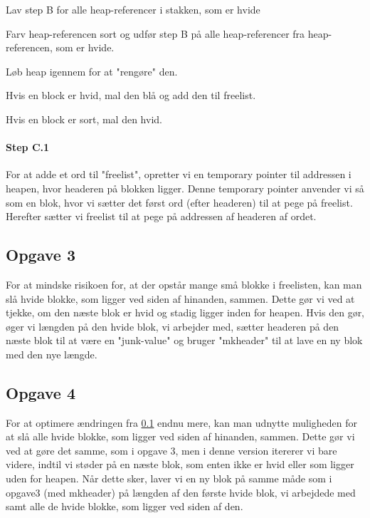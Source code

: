 \begin{my_description}
\item[Step A] Lav step B for alle heap-referencer i stakken, som er hvide
\item[Step B] Farv heap-referencen sort og udfør step B på alle heap-referencer fra heap-referencen, som er hvide.
\item[Step C] Løb heap igennem for at "rengøre" den.
	\begin{my_description}
	\item[Step C.1] Hvis en block er hvid, mal den blå og add den til freelist.
	\item[Step C.2] Hvis en block er sort, mal den hvid.
	\end{my_description}
\end{my_description}

\paragraph{Step C.1}
For at adde et ord til "freelist", opretter vi en temporary pointer til addressen i heapen, hvor headeren på blokken ligger. Denne temporary pointer anvender vi så som en blok, hvor vi sætter det først ord (efter headeren) til at pege på freelist. Herefter sætter vi freelist til at pege på addressen af headeren af ordet.

\subsection{Opgave 3}
\label{O2_3}
For at mindske risikoen for, at der opstår mange små blokke i freelisten, kan man slå hvide blokke, som ligger ved siden af hinanden, sammen. Dette gør vi ved at tjekke, om den næste blok er hvid og stadig ligger inden for heapen. Hvis den gør, øger vi længden på den hvide blok, vi arbejder med, sætter headeren på den næste blok til at være en "junk-value" og bruger "mkheader" til at lave en ny blok med den nye længde.
 
\subsection{Opgave 4}
\label{O2_4}
For at optimere ændringen fra \ref{O2_3} endnu mere, kan man udnytte muligheden for at slå alle hvide blokke, som ligger ved siden af hinanden, sammen. Dette gør vi ved at gøre det samme, som i opgave 3, men i denne version itererer vi bare videre, indtil vi støder på en næste blok, som enten ikke er hvid eller som ligger uden for heapen. Når dette sker, laver vi en ny blok på samme måde som i opgave3 (med mkheader) på længden af den første hvide blok, vi arbejdede med samt alle de hvide blokke, som ligger ved siden af den.


